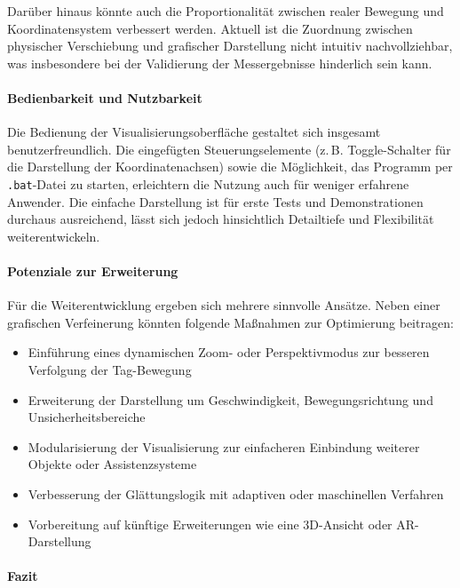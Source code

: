 \documentclass[a4paper, 12pt]{article} %
\begin{document}
Darüber hinaus könnte auch die Proportionalität zwischen realer Bewegung und Koordinatensystem verbessert werden. Aktuell ist die Zuordnung zwischen 
physischer Verschiebung und grafischer Darstellung nicht intuitiv nachvollziehbar, was insbesondere bei der Validierung der Messergebnisse hinderlich 
sein kann.

\paragraph{Bedienbarkeit und Nutzbarkeit}

Die Bedienung der Visualisierungsoberfläche gestaltet sich insgesamt benutzerfreundlich. Die eingefügten Steuerungselemente (z.\,B. Toggle-Schalter 
für die Darstellung der Koordinatenachsen) sowie die Möglichkeit, das Programm per \texttt{.bat}-Datei zu starten, erleichtern die Nutzung auch für 
weniger erfahrene Anwender. Die einfache Darstellung ist für erste Tests und Demonstrationen durchaus ausreichend, lässt sich jedoch hinsichtlich 
Detailtiefe und Flexibilität weiterentwickeln.

\paragraph{Potenziale zur Erweiterung}

Für die Weiterentwicklung ergeben sich mehrere sinnvolle Ansätze. Neben einer grafischen Verfeinerung könnten folgende Maßnahmen zur 
Optimierung beitragen:

\begin{itemize}
    \item Einführung eines dynamischen Zoom- oder Perspektivmodus zur besseren Verfolgung der Tag-Bewegung
    \item Erweiterung der Darstellung um Geschwindigkeit, Bewegungsrichtung und Unsicherheitsbereiche
    \item Modularisierung der Visualisierung zur einfacheren Einbindung weiterer Objekte oder Assistenzsysteme
    \item Verbesserung der Glättungslogik mit adaptiven oder maschinellen Verfahren
    \item Vorbereitung auf künftige Erweiterungen wie eine 3D-Ansicht oder AR-Darstellung
\end{itemize}

\paragraph{Fazit}
\end{document}
